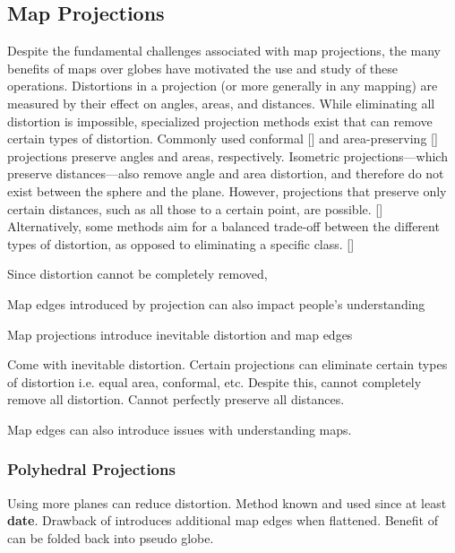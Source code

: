 \subsection{Map Projections}
Despite the fundamental challenges associated with map projections, the many benefits of maps over globes have motivated the use and study of these operations.
Distortions in a projection (or more generally in any mapping) are measured by their effect on angles, areas, and distances.
While eliminating all distortion is impossible, specialized projection methods exist that can remove certain types of distortion.
Commonly used conformal [] and area-preserving [] projections preserve angles and areas, respectively.
Isometric projections---which preserve distances---also remove angle and area distortion, and therefore do not exist between the sphere and the plane.
However, projections that preserve only certain distances, such as all those to a certain point, are possible. []
Alternatively, some methods aim for a balanced trade-off between the different types of distortion, as opposed to eliminating a specific class. []

Since distortion cannot be completely removed,

Map edges introduced by projection can also impact people's understanding 


Map projections introduce inevitable distortion and map edges
\cite{snyder1987map}
\cite{snyder1997flattening}


Come with inevitable distortion.
Certain projections can eliminate certain types of distortion i.e. equal area, conformal, etc.
Despite this, cannot completely remove all distortion.
Cannot perfectly preserve all distances.
\cite{mathematics paper on distortion}
\cite{planar area preserving}
\cite{planar conformal}


Map edges can also introduce issues with understanding maps.
\cite{hennerdal2015beyond}
\cite{hruby2016journey}


\subsubsection{Polyhedral Projections}
Using more planes can reduce distortion.
Method known and used since at least \textbf{date}.
Drawback of introduces additional map edges when flattened.
Benefit of can be folded back into pseudo globe.
\cite{bradley1946equal}
\cite{snyder1992equal}
\cite{van2006slice}
\cite{rocsca2011uniform}
\cite{rocsca2012area}
\cite{holhocs2014octahedral}
\cite{harrison2011optimization}


